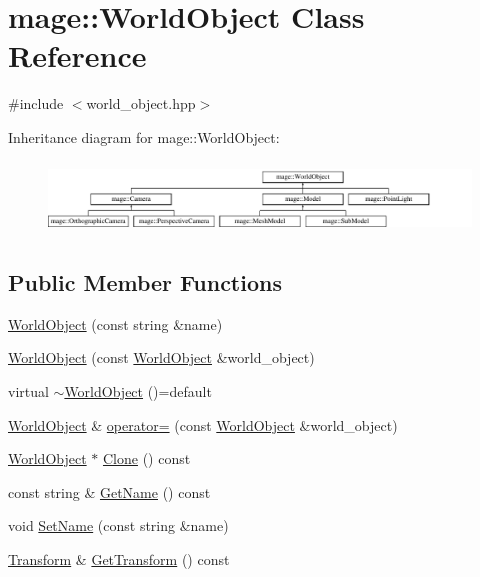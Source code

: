 \hypertarget{classmage_1_1_world_object}{}\section{mage\+:\+:World\+Object Class Reference}
\label{classmage_1_1_world_object}


{\ttfamily \#include $<$world\+\_\+object.\+hpp$>$}

Inheritance diagram for mage\+:\+:World\+Object\+:\begin{figure}[H]
\begin{center}
\leavevmode
\includegraphics[height=1.920000cm]{classmage_1_1_world_object}
\end{center}
\end{figure}
\subsection*{Public Member Functions}
\begin{DoxyCompactItemize}
\item 
\hyperlink{classmage_1_1_world_object_a40d714ae9da1e197171c55f8fd321cc4}{World\+Object} (const string \&name)
\item 
\hyperlink{classmage_1_1_world_object_a4e7ace41518b45c75d975c766de28143}{World\+Object} (const \hyperlink{classmage_1_1_world_object}{World\+Object} \&world\+\_\+object)
\item 
virtual \hyperlink{classmage_1_1_world_object_a6ae28ad98832c1e97b681816755a79f2}{$\sim$\+World\+Object} ()=default
\item 
\hyperlink{classmage_1_1_world_object}{World\+Object} \& \hyperlink{classmage_1_1_world_object_aa53dfc0e654aead5898d0cc76cbc9be6}{operator=} (const \hyperlink{classmage_1_1_world_object}{World\+Object} \&world\+\_\+object)
\item 
\hyperlink{classmage_1_1_world_object}{World\+Object} $\ast$ \hyperlink{classmage_1_1_world_object_a6f464ec7f71740bb89a3ffb0cf6369b2}{Clone} () const
\item 
const string \& \hyperlink{classmage_1_1_world_object_a3aab270d50a8d9ab1f9a970d3e04245f}{Get\+Name} () const
\item 
void \hyperlink{classmage_1_1_world_object_aee42f65080a69ed5cfc681382328fe31}{Set\+Name} (const string \&name)
\item 
\hyperlink{structmage_1_1_transform}{Transform} \& \hyperlink{classmage_1_1_world_object_a9f0ff4d1d3b3c2dd63e91e8127023f47}{Get\+Transform} () const
\end{DoxyCompactItemize}
